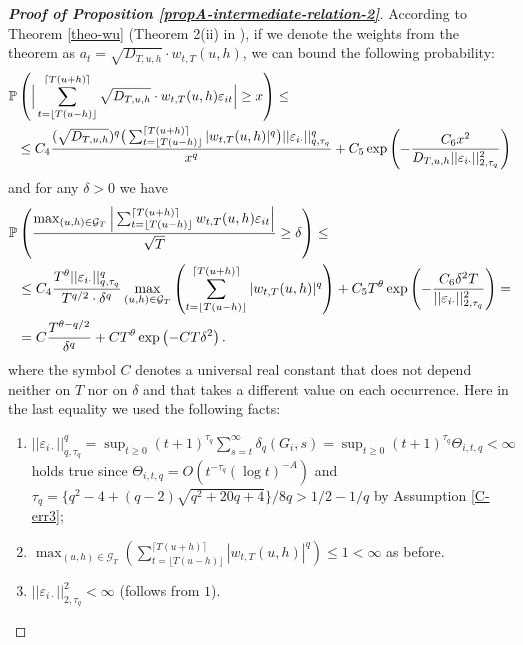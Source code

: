 \documentclass[a4paper,12pt]{article}
\begin{document}
\begin{proof}[\textnormal{\textbf{Proof of Proposition \ref{propA-intermediate-relation-2}}}]
According to Theorem \ref{theo-wu} (Theorem 2(ii) in \cite{Wu2016}), if we denote the weights from the theorem as $a_t = \sqrt{D_{T, u, h}}\cdot w_{t,T}(u,h)$, we can bound the following probability:
\begin{align*}
\mathbb{P}&\left(\Big| \sum_{t=\lfloor T(u-h) \rfloor}^{\lceil T(u+h) \rceil} \sqrt{D_{T, u, h}}\cdot w_{t,T}(u,h)\varepsilon_{it}  \Big| \geq x\right) \leq\\
&\leq C_4 \frac{(\sqrt{D_{T, u, h}})^{q}\big( \sum_{t=\lfloor T(u-h) \rfloor}^{\lceil T(u+h) \rceil} |w_{t,T}(u,h)|^{q}\big) ||\varepsilon_{i\cdot}||^{q}_{q, \tau_q}}{ x^{q}} + C_5 \exp \left(-\frac{C_6  x^2}{D_{T, u, h}||\varepsilon_{i\cdot} ||^{2}_{2, \tau_q}}\right)
\end{align*}
and for any $\delta > 0$ we have
\begin{align*}
\mathbb{P} &\left(\frac{\max_{(u, h) \in \mathcal{G}_T} \Big| \sum_{t=\lfloor T(u-h) \rfloor}^{\lceil T(u+h) \rceil} w_{t,T}(u,h)\varepsilon_{it}  \Big|}{\sqrt{T}} \geq \delta \right) \leq\\
&\leq C_4 \frac{ T^\theta ||\varepsilon_{i\cdot}||^{q}_{q, \tau_q}}{T^{q/2}\cdot \delta^{q}} \max_{(u, h) \in \mathcal{G}_T} \left( \sum_{t=\lfloor T(u-h) \rfloor}^{\lceil T(u+h) \rceil} |w_{t,T}(u,h)|^{q}\right)+ C_5 T^\theta \exp \left(-\frac{C_6 \delta^2 T}{||\varepsilon_{i\cdot}||^{2}_{2, \tau_q}}\right) = \\
&= C \frac{ T^{\theta - q/2}}{\delta^{q}} + C T^\theta \exp \left(-C T \delta^2\right).
\end{align*}
where the symbol $C$ denotes a universal real constant that does not depend neither on $T$ nor on $\delta$ and that takes a different value on each occurrence. Here in the last equality we used the following facts:
\begin{enumerate}
	\item $||\varepsilon_{i\cdot}||^{q}_{q, \tau_q} = \sup_{t\geq 0} (t+1)^{\tau_q} \sum_{s=t}^{\infty} \delta_{q}(G_{i}, s)  = \sup_{t\geq 0} (t+1)^{\tau_q} \Theta_{i, t, q} < \infty$ holds true since $\Theta_{i, t, q} =O ( t^{-\tau_q} (\log t)^{-A} )$ and $\tau_q = \{q^2 - 4 + (q-2) \sqrt{q^2 + 20q + 4}\} / 8q > 1/2 - 1/q$ by Assumption \ref{C-err3};
	\item $\max_{(u, h) \in \mathcal{G}_T} \left( \sum_{t=\lfloor T(u-h) \rfloor}^{\lceil T(u+h) \rceil} |w_{t,T}(u,h)|^{q}\right) \leq 1 < \infty$ as before.
	\item $||\varepsilon_{i\cdot}||^{2}_{2, \tau_q} < \infty$ (follows from $1$).
\end{enumerate}



\end{proof}
\end{document}
